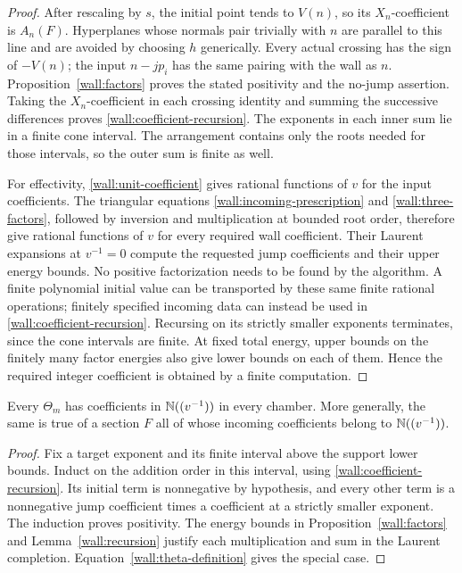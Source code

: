 \begin{proof}
After rescaling by $s$, the initial point tends to $V(n)$, so its
$X_n$-coefficient is $A_n(F)$.  Hyperplanes whose normals pair
trivially with $n$ are parallel to this line and are avoided by
choosing $h$ generically.  Every actual crossing has the sign of
$-V(n)$; the input $n-jp_i$ has the same pairing with the wall as
$n$.  Proposition~\ref{wall:factors} proves the stated positivity
and the no-jump assertion.  Taking the $X_n$-coefficient in each
crossing identity and summing the successive differences proves
\eqref{wall:coefficient-recursion}.  The exponents in each inner
sum lie in a finite cone interval.  The arrangement contains only
the roots needed for those intervals, so the outer sum is finite
as well.

For effectivity, \eqref{wall:unit-coefficient} gives rational
functions of $v$ for the input coefficients.  The triangular
equations \eqref{wall:incoming-prescription} and
\eqref{wall:three-factors}, followed by inversion and multiplication
at bounded root order, therefore give rational functions of $v$
for every required wall coefficient.  Their Laurent expansions
at $v^{-1}=0$ compute the requested jump coefficients and their
upper energy bounds.  No positive factorization needs to be
found by the algorithm.  A finite polynomial initial value can
be transported by these same finite rational operations; finitely
specified incoming data can instead be used in
\eqref{wall:coefficient-recursion}.  Recursing on its strictly
smaller exponents terminates, since the cone intervals are finite.
At fixed total energy, upper
bounds on the finitely many factor energies also give lower
bounds on each of them.  Hence the required integer coefficient
is obtained by a finite computation.
\end{proof}

\begin{theorem}
\label{wall:positivity}
Every $\Theta_m$ has coefficients in $\mathbb N((v^{-1}))$ in every
chamber.  More generally, the same is true of a section $F$ all
of whose incoming coefficients belong to $\mathbb N((v^{-1}))$.
\end{theorem}

\begin{proof}
Fix a target exponent and its finite interval above the support
lower bounds.  Induct on the addition order in this interval,
using \eqref{wall:coefficient-recursion}.  Its initial term is
nonnegative by hypothesis, and every other term is a nonnegative
jump coefficient times a coefficient at a strictly smaller
exponent.  The induction proves positivity.  The energy bounds
in Proposition~\ref{wall:factors} and Lemma~\ref{wall:recursion}
justify each multiplication and sum in the Laurent completion.
Equation~\eqref{wall:theta-definition} gives the special case.
\end{proof}

